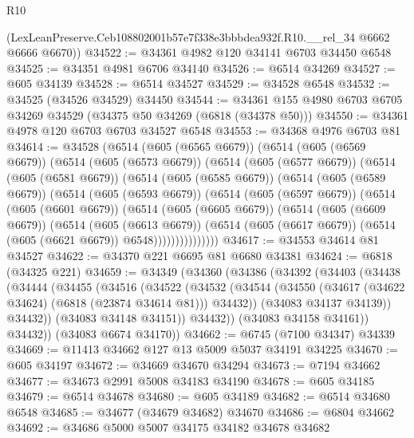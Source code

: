 \begin{lexlean}{R10}
\begin{coremodule}
      (LexLeanPreserve.Ceb108802001b57e7f338e3bbbdea932f.R10.__rel_34 @6662 @6666 @6670))
@34522 := @34361 @4982 @120 @34141 @6703 @34450 @6548
@34525 := @34351 @4981 @6706 @34140
@34526 := @6514 @34269
@34527 := @605 @34139
@34528 := @6514 @34527
@34529 := @34528 @6548
@34532 := @34525 (@34526 @34529) @34450
@34544 := @34361 @155 @4980 @6703 @6705 @34269 @34529 (@34375 @50 @34269 (@6818 (@34378 @50)))
@34550 := @34361 @4978 @120 @6703 @6703 @34527 @6548
@34553 := @34368 @4976 @6703 @81
@34614 := @34528
    (@6514
      (@605 (@6565 @6679))
      (@6514
        (@605 (@6569 @6679))
        (@6514
          (@605 (@6573 @6679))
          (@6514
            (@605 (@6577 @6679))
            (@6514
              (@605 (@6581 @6679))
              (@6514
                (@605 (@6585 @6679))
                (@6514
                  (@605 (@6589 @6679))
                  (@6514
                    (@605 (@6593 @6679))
                    (@6514
                      (@605 (@6597 @6679))
                      (@6514
                        (@605 (@6601 @6679))
                        (@6514
                          (@605 (@6605 @6679))
                          (@6514
                            (@605 (@6609 @6679))
                            (@6514
                              (@605 (@6613 @6679))
                              (@6514
                                (@605 (@6617 @6679))
                                (@6514 (@605 (@6621 @6679)) @6548)))))))))))))))
@34617 := @34553 @34614 @81 @34527
@34622 := @34370 @221 @6695 @81 @6680 @34381
@34624 := @6818 (@34325 @221)
@34659 := @34349
    (@34360
      (@34386
        (@34392
          (@34403
            (@34438
              (@34444
                (@34455
                  (@34516
                    (@34522
                      (@34532
                        (@34544
                          (@34550 (@34617 (@34622 @34624) (@6818 (@23874 @34614 @81))) @34432))
                        (@34083 @34137 @34139))
                      @34432))
                  (@34083 @34148 @34151))
                @34432))
            (@34083 @34158 @34161))
          @34432))
      (@34083 @6674 @34170))
@34662 := @6745 (@7100 @34347) @34339
@34669 := @11413 @34662 @127 @13 @5009 @5037 @34191 @34225
@34670 := @605 @34197
@34672 := @34669 @34670 @34294
@34673 := @7194 @34662
@34677 := @34673 @2991 @5008 @34183 @34190
@34678 := @605 @34185
@34679 := @6514 @34678
@34680 := @605 @34189
@34682 := @6514 @34680 @6548
@34685 := @34677 (@34679 @34682) @34670
@34686 := @6804 @34662
@34692 := @34686 @5000 @5007 @34175 @34182 @34678 @34682

\end{coremodule}
\end{lexlean}
